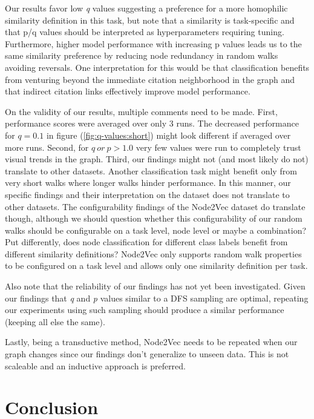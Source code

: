\documentclass[a4paper,10pt]{article}
\begin{document}
Our results favor low \textit{q} values suggesting a preference for a more homophilic similarity definition in this task, but note that a similarity is task-specific and that p/q values should be interpreted as hyperparameters requiring tuning. Furthermore, higher model performance with increasing p values leads us to the same similarity preference by reducing node redundancy in random walks avoiding reversals. One interpretation for this would be that classification benefits from venturing beyond the immediate citation neighborhood in the graph and that indirect citation links effectively improve model performance.

On the validity of our results, multiple comments need to be made. First, performance scores were averaged over only 3 runs. The decreased performance for $q = 0.1$ in figure (\ref{fig:q-values:short}) might look different if averaged over more runs. Second, for $q \ or \ p > 1.0$ very few values were run to completely trust visual trends in the graph. Third, our findings might not (and most likely do not) translate to other datasets. Another classification task might benefit only from very short walks where longer walks hinder performance. In this manner, our specific findings and their interpretation on the dataset does not translate to other datasets. The configurability findings of the Node2Vec dataset do translate though, although we should question whether this configurability of our random walks should be configurable on a task level, node level or maybe a combination? Put differently, does node classification for different class labels benefit from different similarity definitions? Node2Vec only supports random walk properties to be configured on a task level and allows only one similarity definition per task.

Also note that the reliability of our findings has not yet been investigated. Given our findings that \textit{q} and \textit{p} values similar to a DFS sampling are optimal, repeating our experiments using such sampling should produce a similar performance (keeping all else the same).

Lastly, being a transductive method, Node2Vec needs to be repeated when our graph changes since our findings don't generalize to unseen data. This is not scaleable and an inductive approach is preferred.

\section{Conclusion}
\end{document}

